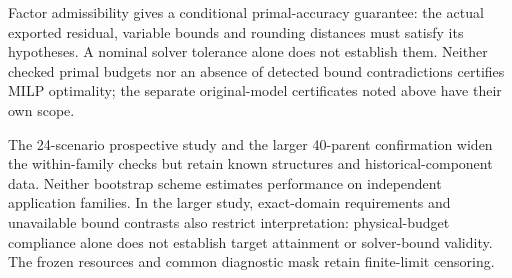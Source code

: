 Factor admissibility gives a conditional primal-accuracy guarantee: the actual
exported residual, variable bounds and rounding distances must satisfy its
hypotheses. A nominal solver tolerance alone does not establish them. Neither
checked primal budgets nor an absence of detected bound contradictions certifies
MILP optimality; the separate original-model certificates noted above have their
own scope.

The 24-scenario prospective study and the larger 40-parent confirmation widen
the within-family checks but retain known structures and historical-component
data. Neither bootstrap scheme estimates performance on independent application
families. In the larger study, exact-domain requirements and unavailable bound
contrasts also restrict interpretation: physical-budget compliance alone does
not establish target attainment or solver-bound validity. The frozen resources
and common diagnostic mask retain finite-limit censoring.

